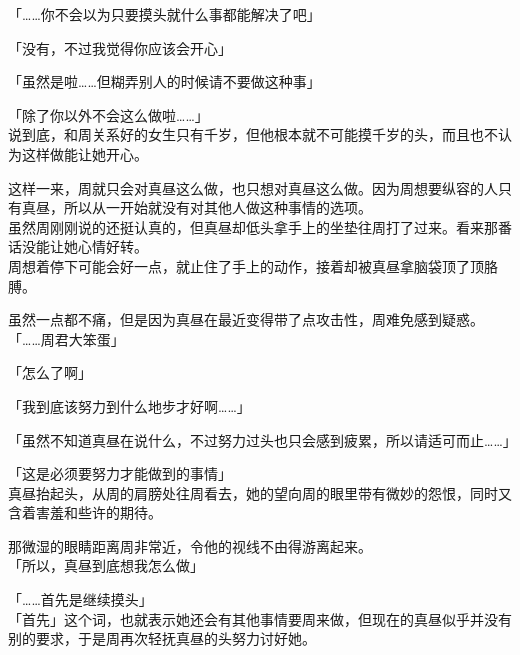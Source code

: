 「……你不会以为只要摸头就什么事都能解决了吧」

「没有，不过我觉得你应该会开心」

「虽然是啦……但糊弄别人的时候请不要做这种事」

「除了你以外不会这么做啦……」\\

说到底，和周关系好的女生只有千岁，但他根本就不可能摸千岁的头，而且也不认为这样做能让她开心。

这样一来，周就只会对真昼这么做，也只想对真昼这么做。因为周想要纵容的人只有真昼，所以从一开始就没有对其他人做这种事情的选项。\\

虽然周刚刚说的还挺认真的，但真昼却低头拿手上的坐垫往周打了过来。看来那番话没能让她心情好转。\\

周想着停下可能会好一点，就止住了手上的动作，接着却被真昼拿脑袋顶了顶胳膊。

虽然一点都不痛，但是因为真昼在最近变得带了点攻击性，周难免感到疑惑。\\

「……周君大笨蛋」

「怎么了啊」

「我到底该努力到什么地步才好啊……」

「虽然不知道真昼在说什么，不过努力过头也只会感到疲累，所以请适可而止……」

「这是必须要努力才能做到的事情」\\

真昼抬起头，从周的肩膀处往周看去，她的望向周的眼里带有微妙的怨恨，同时又含着害羞和些许的期待。

那微湿的眼睛距离周非常近，令他的视线不由得游离起来。\\

「所以，真昼到底想我怎么做」

「……首先是继续摸头」\\

「首先」这个词，也就表示她还会有其他事情要周来做，但现在的真昼似乎并没有别的要求，于是周再次轻抚真昼的头努力讨好她。
